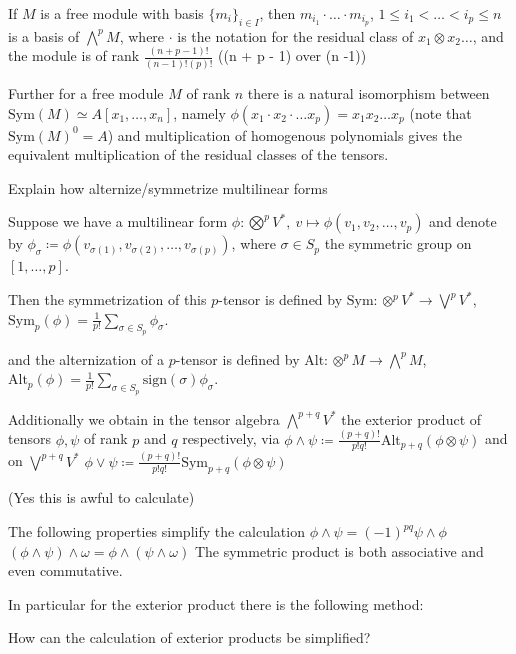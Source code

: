 If \(M\) is a free module with basis \(\{m_i\}_{i \in I}\), then
\(m_{i_1} \cdot \dots \cdot m_{i_p}\), \(1 \leq i_1 < \dots < i_p \leq n\) is a basis of \(\bigwedge^{p} M\), where \(\cdot\) is the notation for the residual class of \(x_1 \otimes x_2 \dots\), and the module is of rank \(\frac{(n + p - 1)!}{(n-1)!(p)!}\) ((n + p - 1) over (n -1))

Further for a free module \(M\) of rank \(n\) there is a natural isomorphism between \(\text{Sym}(M) \simeq A[x_1, \dots, x_n]\),
namely \(\phi(x_1 \cdot x_2 \cdot \dots x_p) = x_1 x_2 \dots x_p\) (note that \(\text{Sym}(M)^{0} = A\)) and multiplication of homogenous
polynomials gives the equivalent multiplication of the residual classes of the tensors.

Explain how alternize/symmetrize multilinear forms

Suppose we have a multilinear form \( \phi : \bigotimes^p V^\ast,\ v \mapsto \phi(v_1, v_2, \dots, v_p) \) 
and denote by \( \phi_\sigma \coloneqq \phi(v_{\sigma(1)}, v_{\sigma(2)}, \dots, v_{\sigma(p)})\), where \( \sigma \in S_p \)
the symmetric group on \( [1, \dots, p] \).

Then the symmetrization of this \( p \)-tensor is defined by \( \text{Sym} : \otimes^p V^\ast \to \bigvee^p V^\ast \),
\( \text{Sym}_p(\phi) = \frac{1}{p!}\sum_{\sigma \in S_p} \phi_\sigma\).

and the alternization of a \( p \)-tensor is defined by \( \text{Alt} : \otimes^p M \to \bigwedge^p M \),
\( \text{Alt}_p(\phi) = \frac{1}{p!}\sum_{\sigma \in S_p} \text{sign}(\sigma) \phi_\sigma\).

Additionally we obtain in the tensor algebra \( \bigwedge^{p+q} V^\ast \)
the exterior product of tensors \( \phi, \psi \) of rank \( p \) and \( q \) respectively, via
\( \phi \wedge \psi \coloneqq \frac{(p+q)!}{p!q!}\text{Alt}_{p+q}(\phi \otimes \psi) \)
and on \( \bigvee^{p+q} V^\ast \)
\( \phi \vee \psi \coloneqq \frac{(p+q)!}{p!q!}\text{Sym}_{p+q}(\phi \otimes \psi) \)

(Yes this is awful to calculate)

The following properties simplify the calculation 
\( \phi \wedge \psi = (-1)^{pq} \psi \wedge \phi \)
\( (\phi \wedge \psi) \wedge \omega = \phi \wedge (\psi \wedge \omega) \)
The symmetric product is both associative and even commutative.



In particular for the exterior product there is the following method:

How can the calculation of exterior products be simplified?

